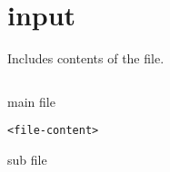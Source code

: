 \documentclass[../../latex]{subfiles}
\begin{document}
\section{input}

Includes contents of the file.

\begin{minipage}{0.47 \textwidth}
  \begin{listing}[H]
    \begin{verbatim}

    \end{verbatim}
    \caption{main file}
  \end{listing}
\end{minipage}
\hfill
\begin{minipage}{0.47 \textwidth}
  \begin{listing}[H]
    \begin{verbatim}
<file-content>
    \end{verbatim}
    \caption{sub file}
  \end{listing}
\end{minipage}
\end{document}
